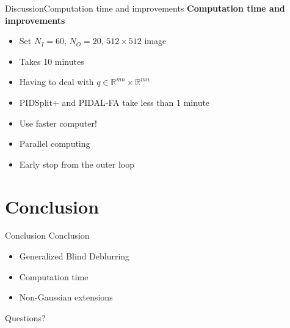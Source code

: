 \documentclass{beamer}
\begin{document}
\begin{frame}[t]{Discussion}{Computation time and improvements}
\textbf{Computation time and improvements}
\begin{itemize}
    \item Set $N_I=60$, $N_O=20$, $512\times 512$ image
    \item Takes 10 minutes
    \item Having to deal with $q \in \mathbb{R}^{mn} \times \mathbb{R}^{mn}$
    \item PIDSplit+ and PIDAL-FA take less than 1 minute
    \item Use faster computer!
    \item Parallel computing
    \item Early stop from the outer loop
\end{itemize}
\end{frame}

\section{Conclusion}
\begin{frame}[t]{Conclusion}
Conclusion

\begin{itemize}
    \item Generalized Blind Deblurring 
    \item Computation time 
    \item Non-Gaussian extensions
\end{itemize}
\end{frame}

\begin{frame}{}

\vspace{3cm}

Questions?
    
\end{frame}
\end{document}
